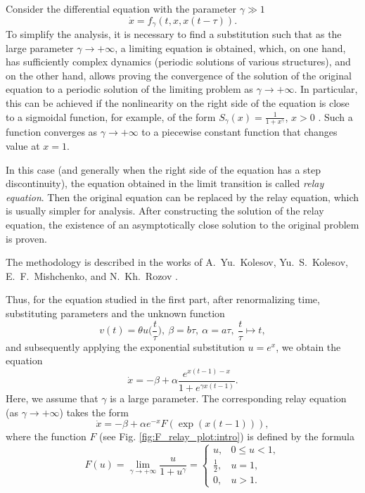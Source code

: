 Consider the differential equation with the parameter $\gamma \gg 1$
\[
\dot{x} = f_{\gamma}(t, x, x(t - \tau)).
\]
To simplify the analysis, it is necessary to find a substitution such that as the large parameter $\gamma \to +\infty$, a limiting equation is obtained, which, on one hand, has sufficiently complex dynamics (periodic solutions of various structures), and on the other hand, allows proving the convergence of the solution of the original equation to a periodic solution of the limiting problem as $\gamma \to +\infty$. In particular, this can be achieved if the nonlinearity on the right side of the equation is close to a sigmoidal function, for example, of the form $S_\gamma(x) = \frac{1}{1 + x^\gamma}$, $x > 0$ \cite{Preobrazhenskaya2020, Glyzin2017, Krisztin2020, Bartha2021}. Such a function converges as $\gamma \to +\infty$ to a piecewise constant function that changes value at $x = 1$.

In this case (and generally when the right side of the equation has a step discontinuity), the equation obtained in the limit transition is called \emph{relay equation}. Then the original equation can be replaced by the relay equation, which is usually simpler for analysis. After constructing the solution of the relay equation, the existence of an asymptotically close solution to the original problem is proven.

The methodology is described in the works of A.~Yu.~Kolesov, Yu.~S.~Kolesov, E.~F.~Mishchenko, and N.~Kh.~Rozov \cite{KolesovKolesov1993, Kolesov2010}.

Thus, for the equation studied in the first part, after renormalizing time, substituting parameters and the unknown function 
\begin{equation}
	\label{eq:intro_substitutions_v}
	v(t) = \theta u\Big(\frac{t}{\tau}\Big),\ \beta = b\tau,\ \alpha = a\tau, \ \frac{t}{\tau} \mapsto t,
\end{equation}
and subsequently applying the exponential substitution $u = e^x$, we obtain the equation
\begin{equation}
	\label{eq:intro:MG_norm1}
	\dot{x} = -\beta + \alpha \frac{e^{x(t-1) - x}}{1 + e^{\gamma x(t-1)}}.
\end{equation}
Here, we assume that $\gamma$ is a large parameter. The corresponding relay equation (as $\gamma \to +\infty$) takes the form
\begin{equation}
	\label{eq:intro:MG_norm_relay}
	\dot{x} = -\beta + \alpha e^{-x} F(\exp(x(t-1))),
\end{equation}
where the function $F$ (see Fig. \ref{fig:F_relay_plot:intro}) is defined by the formula
\begin{equation}
	\label{eq:intro:F_relay}
	F(u) = \lim\limits_{\gamma \to +\infty} \frac{u}{1 + u^{\gamma}} = 
	\begin{cases}
		u, & 0 \leq u < 1,\\
		\frac{1}{2}, & u = 1,\\
		0, & u > 1.
	\end{cases}
\end{equation}

